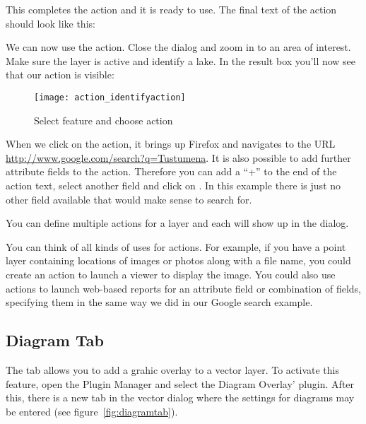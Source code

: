 This completes the action and it is ready to use. The final text of the action
should look like this:


We can now use the action. Close the  dialog and zoom in to an area
of interest. Make sure the  layer is active and identify a
lake. In the result box you'll now see that our action is visible:

\begin{figure}[ht]
   \centering
   \caption{Select feature and choose action \nixcaption}\label{fig:identify_action}
   \texttt{[image: action\_identifyaction]} 
 \end{figure}

When we click on the action, it brings up Firefox and navigates to the URL
\url{http://www.google.com/search?q=Tustumena}. It is also possible to add further 
attribute fields to the action. Therefore you can add a ``+'' to the end of the action 
text, select another field and click on . In this example there 
is just no other field available that would make sense to search for.

You can define multiple actions for a layer and each will show up in the
 dialog. 

You can think of all kinds of uses for actions. For example, if you have a point layer
containing locations of images or photos along with a file name, you could
create an action to launch a viewer to display the image. You could also use
actions to launch web-based reports for an attribute field or combination of
fields, specifying them in the same way we did in our Google search example.

\subsection{Diagram Tab}\label{sec:diagram}

The  tab allows you to add a grahic overlay to a vector layer.
To activate this feature, open the Plugin Manager and select the Diagram Overlay' 
plugin. After this, there is a new tab in the vector  dialog where the settings for diagrams may be entered (see
figure~\ref{fig:diagramtab}).

